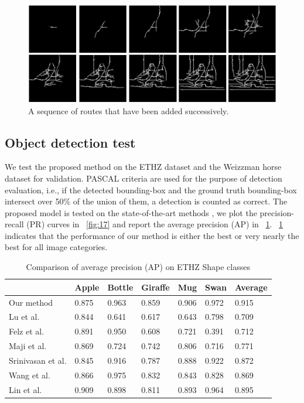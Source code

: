 \documentclass[journal]{IEEEtran}
\begin{document}
\begin{figure}[!t]
\centering
\includegraphics[width=0.8\linewidth]{images/fig20.jpg}
\caption{A sequence of routes that have been added successively.}
\label{fig:20}
\end{figure}

\subsection{Object detection test}

We test the proposed method on the ETHZ dataset and the Weizzman horse dataset for validation.
PASCAL criteria are used for the purpose of detection evaluation, 
i.e., if the detected bounding-box and the ground truth bounding-box intersect over 50\%{} of the union of them, 
a detection is counted as correct.
The proposed model is tested on the state-of-the-art methods 
\cite{lu2009,felzenszwalb2007,maji2009,srinivasan2010,wang2012,lin2012},
we plot the precision-recall (PR) curves in \figurename~\ref{fig:17} 
and report the average precision (AP) in \tablename~\ref{tab:1}.
\tablename~\ref{tab:1} indicates that the performance of our method is either the best or very nearly the best for all image categories.
 
\begin{table}[!t]
\renewcommand{\arraystretch}{1.3}
\caption{Comparison of average precision (AP) on ETHZ Shape classes}
\label{tab:1}
\centering
\scriptsize
\begin{tabular}{l|llllll}
\hline
& Apple & Bottle & Giraffe & Mug & Swan & Average \\
\hline
Our method  & 0.875 & 0.963 & 0.859 & 0.906 & 0.972 & 0.915 \\
Lu et al.\cite{lu2009}  & 0.844     & 0.641 & 0.617 & 0.643 & 0.798 & 0.709 \\
Felz et al.\cite{felzenszwalb2007} & 0.891   & 0.950 & 0.608 & 0.721 & 0.391 & 0.712 \\
Maji et al.\cite{maji2009}  & 0.869   & 0.724 & 0.742 & 0.806 & 0.716 & 0.771 \\
Srinivasan et al.\cite{srinivasan2010}  & 0.845     & 0.916 & 0.787 & 0.888 & 0.922 & 0.872 \\
Wang et al.\cite{wang2012} & 0.866   & 0.975 & 0.832 & 0.843 & 0.828 & 0.869 \\
Lin et al.\cite{lin2012}  & 0.909   & 0.898 & 0.811 & 0.893 & 0.964 & 0.895 \\
\hline
\end{tabular}
\end{table}
\end{document}
